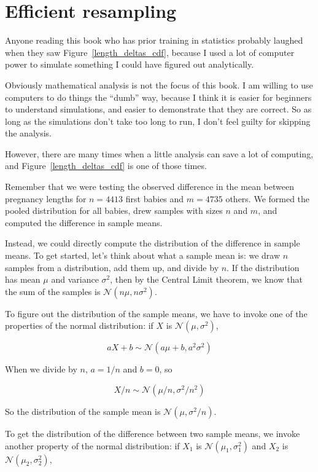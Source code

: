 \documentclass[12pt]{book}
\begin{document}
\section{Efficient resampling}

Anyone reading this book who has prior training in statistics probably
laughed when they saw Figure~\ref{length_deltas_cdf}, because I used a
lot of computer power to simulate something I could have figured out
analytically.

Obviously mathematical analysis is not the focus of this book.  I am
willing to use computers to do things the ``dumb'' way, because I
think it is easier for beginners to understand simulations, and easier
to demonstrate that they are correct.  So as long as the simulations
don't take too long to run, I don't feel guilty for skipping the
analysis.

However, there are many times when a little analysis can save a lot of
computing, and Figure~\ref{length_deltas_cdf} is one of those times.

Remember that we were testing the observed difference in the mean between
pregnancy lengths for $n=4413$ first babies and $m=4735$ others.  We formed
the pooled distribution for all babies, drew samples with sizes $n$ and
$m$, and computed the difference in sample means.

Instead, we could directly compute the distribution of the difference
in sample means.  To get started, let's think about what a sample mean
is: we draw $n$ samples from a distribution, add them up, and
divide by $n$.  If the distribution has mean $\mu$ and variance
$\sigma^2$, then by the Central Limit theorem, we know that the sum of
the samples is $\mathcal{N} (n \mu, n \sigma^2)$.

To figure out the distribution of the sample means, we have to invoke
one of the properties of the normal distribution: if $X$ is
$\mathcal{N} (\mu, \sigma^2)$,

\[ aX + b \sim \mathcal{N} (a \mu + b, a^2 \sigma^2) \]

When we divide by $n$, $a=1/n$ and $b=0$, so

\[ X/n \sim \mathcal{N} (\mu / n, \sigma^2/ n^2) \]

So the distribution of the sample mean is $\mathcal{N} (\mu, \sigma^2/n)$.

To get the distribution of the difference between two sample means,
we invoke another property of the normal distribution: if $X_1$ is
$\mathcal{N} (\mu_1, \sigma_1^2)$ and $X_2$ is
$\mathcal{N} (\mu_2, \sigma_2^2)$,
\end{document}
